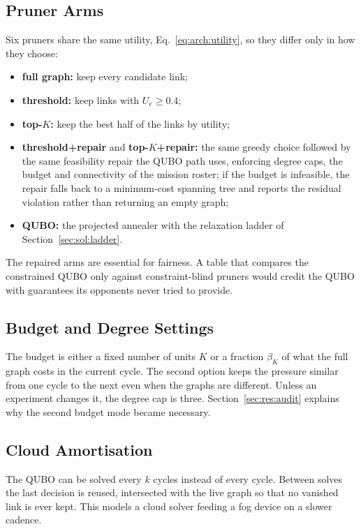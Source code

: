\subsection{Pruner Arms}

Six pruners share the same utility, Eq.~\eqref{eq:arch:utility}, so they
differ only in how they choose:

\begin{itemize}
\item \textbf{full graph:} keep every candidate link;
\item \textbf{threshold:} keep links with $U_e\ge0.4$;
\item \textbf{top-$K$:} keep the best half of the links by utility;
\item \textbf{threshold+repair} and \textbf{top-$K$+repair:} the same greedy
choice followed by the same feasibility repair the QUBO path uses, enforcing
degree caps, the budget and connectivity of the mission roster; if the budget
is infeasible, the repair falls back to a minimum-cost spanning tree and
reports the residual violation rather than returning an empty graph;
\item \textbf{QUBO:} the projected annealer with the relaxation ladder of
Section~\ref{sec:sol:ladder}.
\end{itemize}

The repaired arms are essential for fairness. A table that compares the
constrained QUBO only against constraint-blind pruners would credit the QUBO
with guarantees its opponents never tried to provide.

\subsection{Budget and Degree Settings}

The budget is either a fixed number of units $K$ or a fraction $\beta_K$ of
what the full graph costs in the current cycle. The second option keeps the
pressure similar from one cycle to the next even when the graphs are
different. Unless an experiment changes it, the degree cap is three. Section~\ref{sec:res:audit} explains why the second budget mode
became necessary.

\subsection{Cloud Amortisation}

The QUBO can be solved every $k$ cycles instead of every cycle. Between
solves the last decision is reused, intersected with the live graph so that
no vanished link is ever kept. This models a cloud solver feeding a fog
device on a slower cadence.

